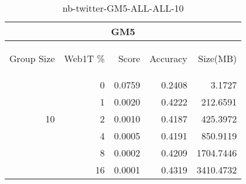 \begin{center}
\begin{table}[htbp]
\begin{tabular}{ | r | r | r | r | r |}
\hline
\multicolumn{5}{|c|}{GM5}\\
\hline
\begin{sideways}Group Size\end{sideways} & \begin{sideways}Web1T \%\end{sideways} & \begin{sideways}Score\end{sideways} & \begin{sideways}Accuracy\end{sideways} & \begin{sideways}Size(MB)\end{sideways}\\
\hline
\multirow{5}{*}{10}
 & 0 & 0.0759 & 0.2408 & 3.1727\\ \cline{2-5}
 & 1 & 0.0020 & 0.4222 & 212.6591\\ \cline{2-5}
 & 2 & 0.0010 & 0.4187 & 425.3972\\ \cline{2-5}
 & 4 & 0.0005 & 0.4191 & 850.9119\\ \cline{2-5}
 & 8 & 0.0002 & 0.4209 & 1704.7446\\ \cline{2-5}
 & 16 & 0.0001 & 0.4319 & 3410.4732\\ \cline{2-5}
\hline
\end{tabular}
\caption{nb-twitter-GM5-ALL-ALL-10}
\label{table:nb-twitter-GM5-ALL-ALL-10}
\end{table}
\end{center}

